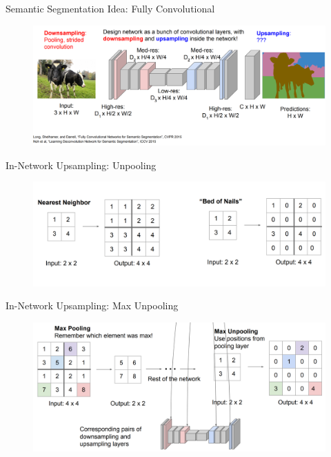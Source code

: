 \documentclass[10pt]{beamer}
\theoremstyle{remark}
\theoremstyle{definition}
\begin{document}
\begin{frame}[allowframebreaks]{Semantic Segmentation Idea: Fully Convolutional}
\framebreak

\begin{figure}
\centering
\includegraphics[width=1.0\textwidth,height=1.0\textheight,keepaspectratio]{./images/sem_10.png}
\end{figure}
    
\end{frame}

\begin{frame}{In-Network Upsampling: Unpooling}
\begin{figure}
\centering
\includegraphics[width=1.0\textwidth,height=1.0\textheight,keepaspectratio]{./images/upsample_1.png}
\end{figure}

\end{frame}

\begin{frame}{In-Network Upsampling: Max Unpooling}
\begin{figure}
\centering
\includegraphics[width=1.0\textwidth,height=1.0\textheight,keepaspectratio]{./images/upsample_2.png}
\end{figure}

\end{frame}
\end{document}
